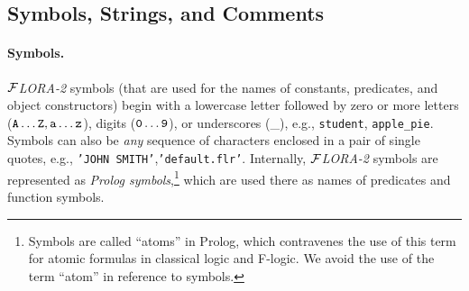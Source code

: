 \documentclass[11pt]{article}
\newcommand{\FLORA}{{\mbox{${\cal F}${\small\it LORA}\rm\emph{-2}}}\xspace}
\newcommand{\fl}{\mbox{F-logic}\xspace}
\begin{document}
\subsection{Symbols, Strings, and Comments}


\paragraph{Symbols.}
\FLORA symbols (that are used for the names of constants, predicates, and
object constructors) begin with a lowercase letter followed by zero or more
letters ($\tt A \ldots Z, a \ldots z$), digits ($\tt 0 \ldots 9$), or underscores
(\_), e.g., \texttt{student}, \texttt{apple\_pie}. Symbols can also be
\emph{any} sequence of characters enclosed in a pair of single quotes,
e.g., \texttt{'JOHN SMITH'},\texttt{'default.flr'}.  Internally, \FLORA
symbols are represented as \emph{Prolog symbols},\footnote{
  Symbols are called ``atoms'' in Prolog, which contravenes the use of this
  term for atomic formulas in classical logic and \fl.
  We avoid the use of the term ``atom'' in reference to symbols.
  }
which are used there as names of predicates and function symbols.
\end{document}
